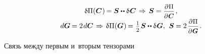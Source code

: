 \begin{otherlanguage}{russian}
\nopagebreak\vspace{-0.4em}\begin{equation}
\begin{array}{c}
\variation{\potentialenergydensity}(\bm{C}\hspace{.1ex}) \hspace{-0.2ex} = \secondpiolakirchhoffstress \dotdotp \variation{\hspace{.1ex} \bm{C}}
\hspace{.25ex} \Rightarrow \hspace{.32ex}
\secondpiolakirchhoffstress = \scalebox{0.92}{$ \displaystyle \frac{\partial \hspace{.1ex} \potentialenergydensity}{\raisemath{-0.1em}{\partial \hspace{.1ex} \bm{C}}} $} \hspace{.24ex} , \\[.5em]
%
d\bm{G} \hspace{-0.12ex} = 2 \hspace{.2ex} d \bm{C}
\hspace{.25ex} \Rightarrow \hspace{.32ex}
\variation{\potentialenergydensity}(\bm{G}\hspace{.1ex}) \hspace{-0.2ex} = \hspace{.1ex} \smalldisplaystyleonehalf \hspace{.2ex} \secondpiolakirchhoffstress \dotdotp \variation{\hspace{.1ex} \bm{G}} ,
\:\,
\secondpiolakirchhoffstress \hspace{-0.1ex} = 2 \hspace{.25ex} \scalebox{0.92}{$ \displaystyle \frac{\partial \hspace{.1ex} \potentialenergydensity}{\raisemath{-0.1em}{\partial \hspace{.1ex} \bm{G}}} $} \hspace{.25ex}.
\end{array}
\end{equation}

Связь между первым и~вторым тензорами


\end{otherlanguage}
